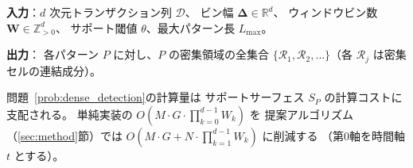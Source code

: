 \begin{problem}[$d$ 次元密集領域検出]\label{prob:dense_detection}
\textbf{入力}：$d$ 次元トランザクション列 $\mathcal{D}$、
ビン幅 $\bm{\Delta} \in \mathbb{R}^d$、
ウィンドウビン数 $\bm{W} \in \mathbb{Z}_{>0}^d$、
サポート閾値 $\theta$、最大パターン長 $L_{\max}$。

\textbf{出力}：
各パターン $P$ に対し、$P$ の密集領域の全集合
$\{\mathcal{R}_1, \mathcal{R}_2, \ldots\}$（各 $\mathcal{R}_j$ は密集セルの連結成分）。
\end{problem}

問題~\ref{prob:dense_detection}の計算量は
サポートサーフェス $S_P$ の計算コストに支配される。
単純実装の $O\!\left(M \cdot G \cdot \prod_{k=0}^{d-1} W_k\right)$ を
提案アルゴリズム（\ref{sec:method}節）では
$O\!\left(M \cdot G + N \cdot \prod_{k=1}^{d-1} W_k\right)$ に削減する
（第0軸を時間軸 $t$ とする）。
